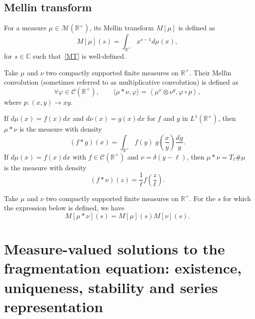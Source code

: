 \documentclass[AHL,Unicode,longabstracts,published]{cedram}
\newcommand*\dst{\displaystyle}
\newcommand*\R{\mathbb{R}}
\newcommand*\C{\mathbb{C}}
\newcommand*\M{\mathcal{M}}
\newcommand{\clC}{\mathcal{C}}
\let\oldforall\forall
\renewcommand*{\forall}{\mathrel{\oldforall}}
\begin{document}
\subsection{Mellin transform}

\begin{defi}
For a measure $\mu \in \M(\R^+)$, its Mellin transform $M[\mu]$ is defined as
\begin{equation}\label{MT}
M[\mu](s)= \dst\int_{\R^+} x^{s-1}d\mu(x),
\end{equation}
for $s\in \C$ such that~\eqref{MT} is well-defined.
\end{defi}


\begin{defi}\label{def:mult_conv}
Take $\mu$ and $\nu$ two compactly supported finite measures on $\R^+$. Their Mellin convolution (sometimes referred to as multiplicative convolution) is defined as
\begin{equation*}
\forall \varphi \in \clC(\R^+), \qquad \langle\mu \ast \nu,\varphi\rangle = \left\langle \mu^x \otimes \nu^y,\varphi\circ p \right\rangle,
\end{equation*}
where $p : (x,y)\to xy$.
\end{defi}

If $d\mu(x)=f(x)dx$ and $d\nu(x)=g(x)dx$ for $f$ and $g$ in $L^1(\R^+)$, then $\mu\ast\nu$ is the measure with density
\begin{equation*}
(f\ast g) (x) =\dst\int_{\R^+} f(y)\; g\left(\dfrac{x}{y}\right)\dfrac{dy}{y}.
\end{equation*}
If $d\mu(x)=f(x)dx$ with $f\in \clC(\R^+)$ and $\nu=\delta(y-\ell)$, then $\mu\ast\nu=T_\ell \# \mu$ is the measure with density
\begin{equation*}
(f\ast \nu)(z)= \dfrac{1}{\ell}f\left(\dfrac{z}{\ell}\right).
\end{equation*}


\begin{prop}\label{prop:MellinMC}
Take $\mu$ and $\nu$ two compactly supported finite measures on $\R^+$. For the $s$ for which the expression below is defined, we have
\begin{equation*}
M[\mu\ast\nu](s) = M[\mu](s) M[\nu](s).
\end{equation*}
\end{prop}



\section{Measure-valued solutions to the fragmentation equation: existence, uniqueness, stability and series representation}
\label{Section20}
\end{document}
